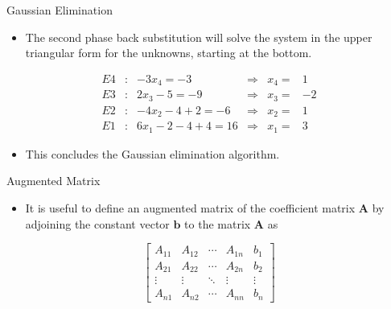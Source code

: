 \documentclass{beamer}
\begin{document}
\begin{frame}{Gaussian Elimination}
\begin{itemize}
\item The second phase  \alert{back substitution} will solve the system in the upper triangular form for the unknowns, starting at the
bottom. 
\end{itemize}
\begin{block}{}
\begin{align*}
E4&:& -3x_4=-3 &\Longrightarrow& x_4=&1\\
E3 &:& 2x_3-5=-9&\Longrightarrow&	x_3=&-2\\
E2&:& -4x_2-4+2=-6 &\Longrightarrow& x_2=&1\\
E1&:&6x_1-2-4 +4 =16 &\Longrightarrow& x_1=&3
\end{align*}
\end{block}
\begin{itemize}
\item This concludes the Gaussian elimination algorithm. 
\end{itemize}


\end{frame}

\begin{frame}{Augmented Matrix}
\begin{itemize}
\item It is  useful to define an \alert{augmented matrix} of the coefficient matrix $\mathbf{A}$ by adjoining the constant vector $\mathbf{b}$ to the matrix $\mathbf{A}$ as
\end{itemize}
\[
\left[ 
\begin{array}{cccc|c}
A_{11} & A_{12} & \cdots & A_{1n} &b_1 \\
A_{21} & A_{22} & \cdots & A_{2n} & b_2\\
\vdots & \vdots & \ddots & \vdots  & \vdots\\
A_{n1} & A_{n2} & \cdots & A_{nn} & b_n 
\end{array}
\right]
\]
\end{frame}
\end{document}
